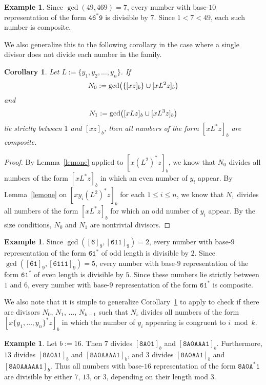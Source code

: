\documentclass[12pt]{article}
\DeclarePairedDelimiter\paren{\lparen}{\rparen}
\theoremstyle{plain}
\newtheorem{corollary}[theorem]{Corollary}
\theoremstyle{definition}
\newtheorem{example}[theorem]{Example}
\theoremstyle{remark}
\newcommand{\0}{\mathtt{0}}
\newcommand{\1}{\mathtt{1}}
\newcommand{\2}{\mathtt{2}}
\newcommand{\3}{\mathtt{3}}
\newcommand{\4}{\mathtt{4}}
\newcommand{\5}{\mathtt{5}}
\newcommand{\6}{\mathtt{6}}
\newcommand{\7}{\mathtt{7}}
\newcommand{\8}{\mathtt{8}}
\newcommand{\9}{\mathtt{9}}
\newcommand{\A}{\mathtt{A}}
\newcommand{\union}{\cup}
\begin{document}
\begin{example}
Since $\gcd(49, 469)=7$, every number with base-$10$ representation
of the form $\4\6^*\9$ is 
divisible by $7$.
Since $1 < 7 < 49$, each such number is composite.
\end{example}

We also generalize this to the following corollary in the case where 
a single divisor does not divide each number in the family.
\begin{corollary}\label{cortwo}
Let $L := \lbrace y_1, y_2, \ldots, y_n \rbrace$.
If \[N_0:=\gcd \paren[\big]{ \{ [xz]_b \} \union [xL^2 z]_b} \]
and
\[ N_1:= \gcd \paren[\big]{[xLz]_b \union [xL^3z]_b} \]
lie strictly between $1$ and $[xz]_b$, then all numbers of the form 
$[xL^*z]_b$ are composite.
\end{corollary}
\begin{proof}
By Lemma~\ref{lemone} applied
to $[x(L^2)^*z]_b$, we know that $N_0$ divides all numbers of the 
form $[x L^* z]_b$ in which an even number of $y_i$ appear.
By Lemma~\ref{lemone} on $[xy_i(L^2)^*z]_b$ 
for each $1\leq i\leq n$, we know that $N_1$ 
divides all numbers of the form $[x L^* z]_b$ for which an 
odd number of $y_i$ appear.
By the size conditions, $N_0$ and $N_1$ are nontrivial divisors.
\end{proof}

\begin{example}
Since $\gcd([\6]_9,[\6\1\1]_9)=2$, every number with
base-$9$ representation of the form $\6\1^*$ of 
odd length is divisible by $2$.
Since $\gcd([\6\1]_9,[\6\1\1\1]_9)=5$,
every number with base-$9$ representation of the form $\6\1^*$ 
of even length is divisible by $5$.  Since these numbers lie 
strictly between $1$ and $6$, every number with base-$9$
representation of the form $\6\1^*$ is 
composite.
\end{example}

We also note that it is simple to generalize Corollary~\ref{cortwo}
to apply to 
check if there are divisors $N_0$, $N_1$, $\dotsc$, $N_{k-1}$ such that
$N_i$ divides all numbers of the form $[x\{y_1,\dotsc,y_n\}^*z]_b$ in which 
the number of $y_i$ appearing is congruent to $i\bmod k$.
\begin{example}
Let $b := 16$.
Then
$7$ divides $[\8\A\0\1]_b$ and $[\8\A\0\A\A\A\1]_b$.
Furthermore, $13$ divides 
$[\8\A\0\A\1]_b$ and $[\8\A\0\A\A\A\A\1]_b$,
and $3$ divides $[\8\A\0\A\A\1]_b$ and 
$[\8\A\0\A\A\A\A\A\1]_b$.  Thus all numbers with base-$16$
representation of the form $\8\A\0\A^*\1$ are 
divisible by either $7$, $13$, or $3$, depending on their 
length mod $3$.
\end{example}
\end{document}
